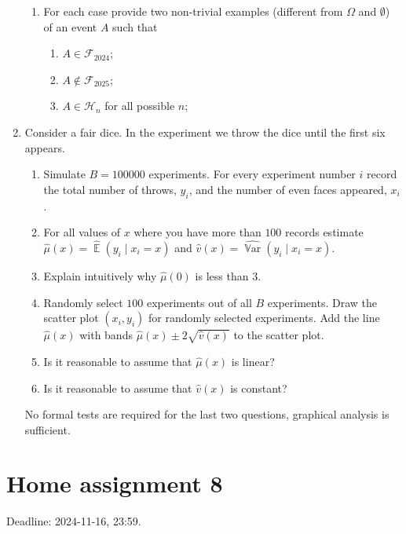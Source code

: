 \documentclass[12pt]{article}
\DeclareMathOperator{\Var}{\mathbb{V}ar}
\DeclareMathOperator{\E}{\mathbb{E}}
\newcommand{\cF}{\mathcal{F}}
\newcommand{\cH}{\mathcal{H}}
\begin{document}
\begin{enumerate}
\begin{enumerate}
\item For each case provide two non-trivial examples (different from $\Omega$ and $\emptyset$) of an event $A$ such that

\begin{enumerate}
\item $A\in \cF_{2024}$;
\item $A\notin \cF_{2025}$;
\item $A \in \cH_{n}$ for all possible $n$;
\end{enumerate}


\end{enumerate}

\item Consider a fair dice. 
In the experiment we throw the dice until the first six appears.

\begin{enumerate}
    \item Simulate $B = 100000$ experiments. 
    For every experiment number $i$ record the total number of throws, $y_i$, and the number of even faces appeared, $x_i$.
    \item For all values of $x$ where you have more than $100$ records estimate $\hat\mu(x) = \hat{\E}(y_i \mid x_i = x)$ and $\hat v(x) = \widehat{\Var}(y_i \mid x_i = x)$.
    \item Explain intuitively why $\hat\mu(0)$ is less than $3$. 
    \item Randomly select $100$ experiments out of all $B$ experiments.
    Draw the scatter plot $(x_i, y_i)$ for randomly selected experiments.
    Add the line $\hat\mu(x)$ with bands $\hat\mu(x) \pm 2\sqrt{\hat v(x)}$ to the scatter plot. 
    \item Is it reasonable to assume that $\hat \mu(x)$ is linear?
    \item Is it reasonable to assume that $\hat v(x)$ is constant?
\end{enumerate}

No formal tests are required for the last two questions, graphical analysis is sufficient.


\end{enumerate}

\section*{Home assignment 8}

Deadline: 2024-11-16, 23:59.
\end{document}
